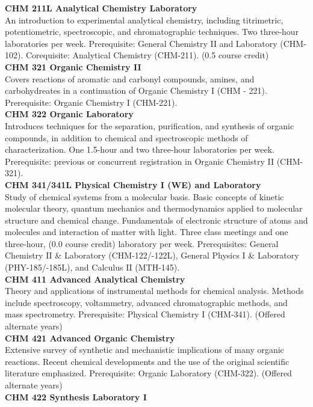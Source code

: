 \documentclass[
  letterpaper,
]{scrbook}
\begin{document}
\textbf{CHM 211L Analytical Chemistry Laboratory}\\
An introduction to experimental analytical chemistry, including
titrimetric, potentiometric, spectroscopic, and chromatographic
techniques. Two three-hour laboratories per week. Prerequisite: General
Chemistry II and Laboratory (CHM-102). Corequisite: Analytical Chemistry
(CHM-211). (0.5 course credit)\\
\textbf{CHM 321 Organic Chemistry II}\\
Covers reactions of aromatic and carbonyl compounds, amines, and
carbohydreates in a continuation of Organic Chemistry I (CHM - 221).
Prerequisite: Organic Chemistry I (CHM-221).\\
\textbf{CHM 322 Organic Laboratory}\\
Introduces techniques for the separation, purification, and synthesis of
organic compounds, in addition to chemical and spectroscopic methods of
characterization. One 1.5-hour and two three-hour laboratories per week.
Prerequisite: previous or concurrent registration in Organic Chemistry
II (CHM-321).\\
\textbf{CHM 341/341L Physical Chemistry I (WE) and Laboratory}\\
Study of chemical systems from a molecular basis. Basic concepts of
kinetic molecular theory, quantum mechanics and thermodynamics applied
to molecular structure and chemical change. Fundamentals of electronic
structure of atoms and molecules and interaction of matter with light.
Three class meetings and one three-hour, (0.0 course credit) laboratory
per week. Prerequisites: General Chemistry II \& Laboratory
(CHM-122/-122L), General Physics I \& Laboratory (PHY-185/-185L), and
Calculus II (MTH-145).\\
\textbf{CHM 411 Advanced Analytical Chemistry}\\
Theory and applications of instrumental methods for chemical analysis.
Methods include spectroscopy, voltammetry, advanced chromatographic
methods, and mass spectrometry. Prerequisite: Physical Chemistry I
(CHM-341). (Offered alternate years)\\
\textbf{CHM 421 Advanced Organic Chemistry}\\
Extensive survey of synthetic and mechanistic implications of many
organic reactions. Recent chemical developments and the use of the
original scientific literature emphasized. Prerequisite: Organic
Laboratory (CHM-322). (Offered alternate years)\\
\textbf{CHM 422 Synthesis Laboratory I}\\
\end{document}
